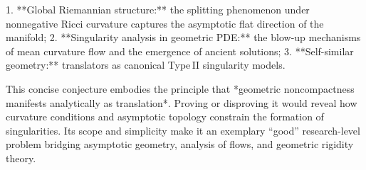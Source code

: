 1. **Global Riemannian structure:** the splitting phenomenon under nonnegative Ricci curvature captures the asymptotic flat direction of the manifold;  
2. **Singularity analysis in geometric PDE:** the blow-up mechanisms of mean curvature flow and the emergence of ancient solutions;  
3. **Self-similar geometry:** translators as canonical Type II singularity models.

This concise conjecture embodies the principle that *geometric noncompactness manifests analytically as translation*. Proving or disproving it would reveal how curvature conditions and asymptotic topology constrain the formation of singularities. Its scope and simplicity make it an exemplary “good” research-level problem bridging asymptotic geometry, analysis of flows, and geometric rigidity theory.